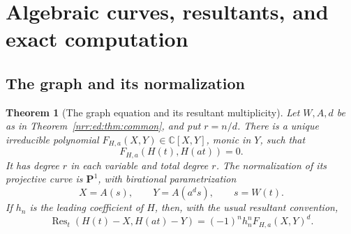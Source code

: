\documentclass[11pt,letterpaper]{article}
\newtheorem{theorem}{Theorem}[section]
\theoremstyle{definition}
\theoremstyle{remark}
\newcommand{\C}{\mathbb C}
\newcommand{\Res}{\operatorname{Res}}
\begin{document}
\section{Algebraic curves, resultants, and exact computation}
\label{nrr:ed:sec:algorithms}

\subsection{The graph and its normalization}

\begin{theorem}[The graph equation and its resultant multiplicity]
\label{nrr:ed:thm:curve}
Let $W,A,d$ be as in Theorem~\ref{nrr:ed:thm:common}, and put $r=n/d$. There is a unique
irreducible polynomial $F_{H,a}(X,Y)\in\C[X,Y]$, monic in $Y$, such that
\[
 F_{H,a}(H(t),H(at))=0.
\]
It has degree $r$ in each variable and total degree $r$. The normalization of
its projective curve is $\mathbf P^1$, with birational parametrization
\begin{equation}
 X=A(s),\qquad Y=A(a^ds),\qquad s=W(t).
 \label{nrr:ed:eq:normalization}
\end{equation}
If $h_n$ is the leading coefficient of $H$, then, with the usual resultant
convention,
\begin{equation}
 \Res_t(H(t)-X,H(at)-Y)=(-1)^n h_n^n F_{H,a}(X,Y)^d.
 \label{nrr:ed:eq:resultant-power}
\end{equation}
\end{theorem}
\end{document}
